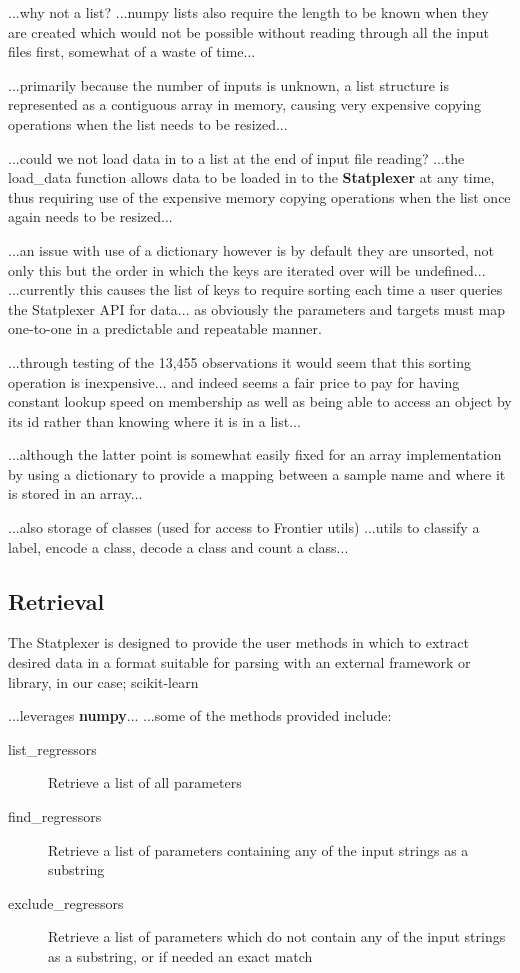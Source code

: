 ...why not a list?
...numpy lists also require the length to be known when they are created which
would not be possible without reading through all the input files first,
somewhat of a waste of time...

...primarily because the number of inputs is unknown, a list structure is
represented as a contiguous array in memory, causing very expensive copying
operations when the list needs to be resized...

...could we not load data in to a list at the end of input file reading?
...the load\_data function allows data to be loaded in to the
\textbf{Statplexer} at any time, thus requiring use of the expensive memory
copying operations when the list once again needs to be resized...


...an issue with use of a dictionary however is by default they are unsorted,
not only this but the order in which the keys are iterated over will be
undefined...
...currently this causes the list of keys to require sorting each time a user
queries the Statplexer API for data... as obviously the parameters and targets
must map one-to-one in a predictable and repeatable manner.

...through testing of the 13,455 observations it would seem that this sorting
operation is inexpensive... and indeed seems a fair price to pay for having
constant lookup speed on membership as well as being able to access an object by
its id rather than knowing where it is in a list...

...although the latter point is somewhat easily fixed for an array
implementation by using a dictionary to provide a mapping between a sample name
and where it is stored in an array...

...also storage of classes (used for access to Frontier utils)
...utils to classify a label, encode a class, decode a class and count a
class...


\subsection{Retrieval}
The Statplexer is designed to provide the user methods in which to extract
desired data in a format suitable for parsing with an external framework or
library, in our case; scikit-learn

...leverages \textbf{numpy}...
...some of the methods provided include:

\begin{description}
    \item[list\_regressors] Retrieve a list of all parameters
    \item[find\_regressors] Retrieve a list of parameters containing any of the
        input strings as a substring
    \item[exclude\_regressors] Retrieve a list of parameters which do not
        contain any of the input strings as a substring, or if needed an exact
        match
\end{description}

